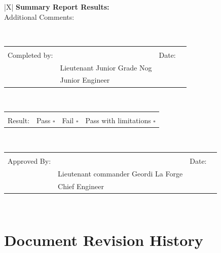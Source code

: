 \documentclass[a4paper,12pt]{article}
\theoremstyle{definition}
\def\arraystretch{1.5}%
\begin{document}
\noindent\bgroup
\def\arraystretch{1.5}%
\begin{tabularx}{\textwidth}{|X|}
	\hline
	\textbf{Summary Report Results:} \\  \hline
	Additional Comments:             \\ \rule{0pt}{12ex}     \\ \hline


	\bgroup
	\def\arraystretch{1.1}%
	\begin{tabular}{@{}p{0.98in}p{3.2in}p{0.3in}p{1.4in}@{}}
		\rule{0pt}{3ex}                                                  \\
		Completed by: & \hrulefill                  & Date: & \hrulefill \\
		              & Lieutenant Junior Grade Nog &       &            \\
		              & Junior Engineer             &       &            \\
	\end{tabular}
	\egroup
	\\ \hline


	\bgroup
	\def\arraystretch{1.1}%
	\begin{tabular}{@{}p{0.98in}p{1.45in}p{1.45in}p{1.6in}@{}}
		\rule{0pt}{.5ex}                                 \\ Result: &
		Pass $\square$ &
		Fail $\square$ &
		Pass with limitations $\square$ \rule{0pt}{.5ex} \\
	\end{tabular}
	\egroup
	\\ \hline



	\bgroup
	\def\arraystretch{1.1}%
	\begin{tabular}{@{}p{0.98in}p{3.2in}p{0.3in}p{1.4in}@{}}
		\rule{0pt}{3ex}                                                          \\
		Approved By: & \hrulefill                           & Date: & \hrulefill \\
		             & Lieutenant commander Geordi La Forge &       &            \\
		             & Chief Engineer                       &       &            \\
	\end{tabular}
	\egroup
	\\ \hline
\end{tabularx}
\egroup

\newpage
\section{Document Revision History}
\end{document}
